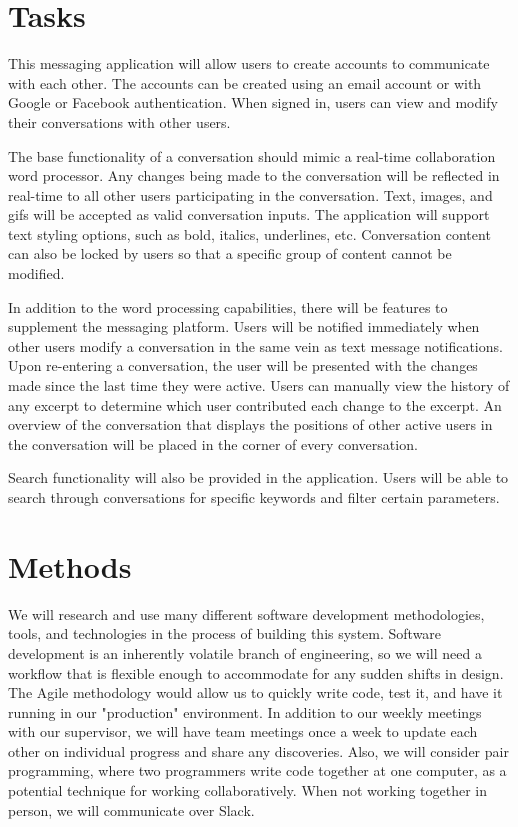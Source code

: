 \documentclass[letterpaper,12pt]{report}
\begin{document}
	\section*{Tasks}
	\markright{}
	This messaging application will allow users to create accounts to
	communicate with each other. The accounts can be created using an email
	account or with Google or Facebook authentication. When signed in, users
	can view and modify their conversations with other users.

	The base functionality of a conversation should mimic a real-time
	collaboration word processor. Any changes being made to the conversation
	will be reflected in real-time to all other users participating in the
	conversation. Text, images, and gifs will be accepted as valid conversation
	inputs. The application will support text styling options, such as bold,
	italics, underlines, etc. Conversation content can also be locked by users
	so that a specific group of content cannot be modified.

	In addition to the word processing capabilities, there will be features to
	supplement the messaging platform.  Users will be notified immediately when
	other users modify a conversation in the same vein as text message
	notifications. Upon re-entering a conversation, the user will be presented
	with the changes made since the last time they were active. Users can
	manually view the history of any excerpt to determine which user
	contributed each change to the excerpt. An overview of the conversation
	that displays the positions of other active users in the conversation will
	be placed in the corner of every conversation.

	Search functionality will also be provided in the application. Users will
	be able to search through conversations for specific keywords and filter
	certain parameters.

	\section*{Methods}
	\markright{}
	We will research and use many different software development methodologies,
	tools, and technologies in the process of building this system. Software
	development is an inherently volatile branch of engineering, so we will
	need a workflow that is flexible enough to accommodate for any sudden shifts
	in design. The Agile methodology would allow us to quickly write code, test
	it, and have it running in our "production" environment. In addition to our
	weekly meetings with our supervisor, we will have team meetings once a week
	to update each other on individual progress and share any discoveries.
	Also, we will consider pair programming, where two programmers write code
	together at one computer, as a potential technique for working
	collaboratively. When not working together in person, we will communicate
	over Slack.
\end{document}
